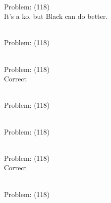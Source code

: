 \documentclass[11pt]{article}
\begin{document}
\begin{minipage}[t]{0.5\textwidth}
  {\centering
  
\\
Problem: (118)\\
It's a ko, but Black can do better.\\
  }
\end{minipage}
\begin{minipage}[t]{0.5\textwidth}
  {\centering
  
\\
Problem: (118)\\
  }
\end{minipage}
\begin{minipage}[t]{0.5\textwidth}
  {\centering
  
\\
Problem: (118)\\
Correct\\
  }
\end{minipage}
\begin{minipage}[t]{0.5\textwidth}
  {\centering
  
\\
Problem: (118)\\
  }
\end{minipage}
\begin{minipage}[t]{0.5\textwidth}
  {\centering
  
\\
Problem: (118)\\
  }
\end{minipage}
\begin{minipage}[t]{0.5\textwidth}
  {\centering
  
\\
Problem: (118)\\
Correct\\
  }
\end{minipage}
\begin{minipage}[t]{0.5\textwidth}
  {\centering
  
\\
Problem: (118)\\
  }
\end{minipage}
\end{document}
